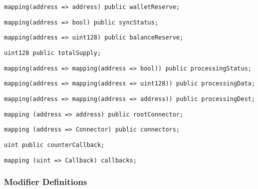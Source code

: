 \begin{lstlisting}[firstnumber=27]
  mapping(address => address) public walletReserve;
\end{lstlisting}

\begin{lstlisting}[firstnumber=28]
  mapping(address => bool) public syncStatus;
\end{lstlisting}

\begin{lstlisting}[firstnumber=29]
  mapping(address => uint128) public balanceReserve;
\end{lstlisting}

\begin{lstlisting}[firstnumber=31]
  uint128 public totalSupply;
\end{lstlisting}

\begin{lstlisting}[firstnumber=33]
  mapping(address => mapping(address => bool)) public processingStatus;
\end{lstlisting}

\begin{lstlisting}[firstnumber=34]
  mapping(address => mapping(address => uint128)) public processingData;
\end{lstlisting}

\begin{lstlisting}[firstnumber=35]
  mapping(address => mapping(address => address)) public processingDest;
\end{lstlisting}

\begin{lstlisting}[firstnumber=43]
  mapping (address => address) public rootConnector;
\end{lstlisting}

\begin{lstlisting}[firstnumber=44]
  mapping (address => Connector) public connectors;
\end{lstlisting}

\begin{lstlisting}[firstnumber=46]
  uint public counterCallback;
\end{lstlisting}

\begin{lstlisting}[firstnumber=62]
  mapping (uint => Callback) callbacks;
\end{lstlisting}

\subsubsection{Modifier Definitions}


